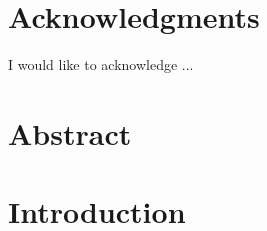 \documentclass[12pt]{report}
\begin{document}
\chapter*{Acknowledgments}
\egroup
{}%

\begin{onehalfspace}

I would like to acknowledge ...

\end{onehalfspace}

\newpage

\begin{singlespace}
\tableofcontents
\end{singlespace}
\newpage

\listoftables
\newpage

\listoffigures
\newpage


\renewcommand{\nomname}{Nomenclature}
\begin{singlespace}
\printnomenclature[3cm] %
\end{singlespace}

\newpage
\bgroup
\titleformat{\chapter}{}{}{0pt}{\normalfont\Large\bfseries}
\titlespacing*{\chapter}{0pt}{0pt}{20pt}
\chapter*{Abstract}
\egroup
{}%

\begin{onehalfspace}

\noindent %
\blindtext

\end{onehalfspace}

\titlespacing*{\chapter}{0pt}{50pt}{40pt}

\chapter{Introduction} \label{c:intro}
    
\end{document}
